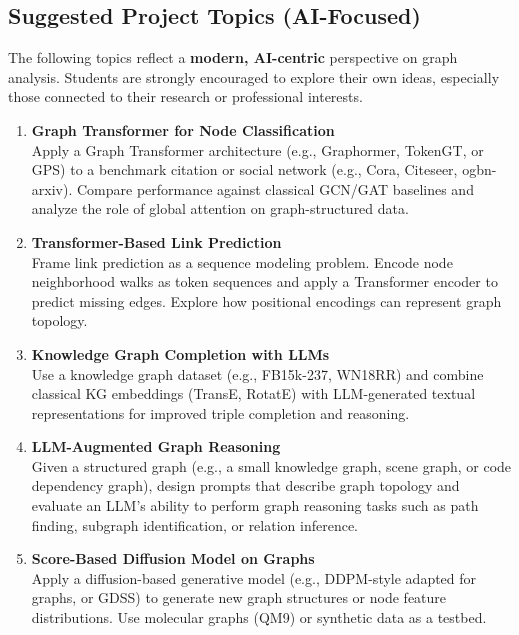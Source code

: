 \documentclass{article}
\begin{document}
\subsection*{Suggested Project Topics (AI-Focused)}

The following topics reflect a \textbf{modern, AI-centric} perspective on graph analysis. Students are strongly encouraged to explore their own ideas, especially those connected to their research or professional interests.

\begin{enumerate}[leftmargin=1.5em, label=\textbf{\arabic*.}]

\item \textbf{Graph Transformer for Node Classification}\\
Apply a Graph Transformer architecture (e.g., Graphormer, TokenGT, or GPS) to a benchmark citation or social network (e.g., Cora, Citeseer, ogbn-arxiv). Compare performance against classical GCN/GAT baselines and analyze the role of global attention on graph-structured data.

\item \textbf{Transformer-Based Link Prediction}\\
Frame link prediction as a sequence modeling problem. Encode node neighborhood walks as token sequences and apply a Transformer encoder to predict missing edges. Explore how positional encodings can represent graph topology.

\item \textbf{Knowledge Graph Completion with LLMs}\\
Use a knowledge graph dataset (e.g., FB15k-237, WN18RR) and combine classical KG embeddings (TransE, RotatE) with LLM-generated textual representations for improved triple completion and reasoning.

\item \textbf{LLM-Augmented Graph Reasoning}\\
Given a structured graph (e.g., a small knowledge graph, scene graph, or code dependency graph), design prompts that describe graph topology and evaluate an LLM's ability to perform graph reasoning tasks such as path finding, subgraph identification, or relation inference.

\item \textbf{Score-Based Diffusion Model on Graphs}\\
Apply a diffusion-based generative model (e.g., DDPM-style adapted for graphs, or GDSS) to generate new graph structures or node feature distributions. Use molecular graphs (QM9) or synthetic data as a testbed.


\end{enumerate}
\end{document}
